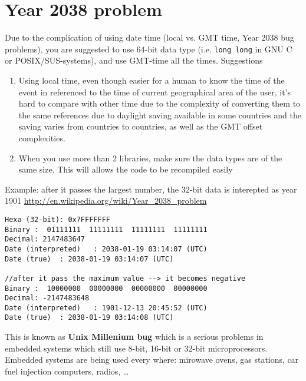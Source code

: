 % 



\section{Year 2038 problem}

Due to the complication of using date time (local vs. GMT time, Year 2038 bug
problems), you are suggested to use 64-bit data type (i.e. \verb!long long! in
GNU C or POSIX/SUS-systems), and use GMT-time all the times. Suggestions
\begin{enumerate}
  \item  Using local time,
even though easier for a human to know the time of the event in referenced to
the time of current geographical area of the user, it's hard to compare with
other time due to the complexity of converting them to the same
references due to daylight saving available in some countries and the saving
varies from countries to countries, as well as the GMT offset complexities.

  \item When you use more than 2 libraries, make sure the data types are of the
same size. This will allows the code to be recompiled easily
  
\end{enumerate}

Example: after it passes the largest number, the 32-bit data
is interepted as year 1901 \url{http://en.wikipedia.org/wiki/Year_2038_problem}
\begin{verbatim}
Hexa (32-bit): 0x7FFFFFFF
Binary :  01111111  11111111  11111111  11111111  
Decimal: 2147483647
Date (interpreted)   : 2038-01-19 03:14:07 (UTC)
Date (true)  : 2038-01-19 03:14:07 (UTC)

//after it pass the maximum value --> it becomes negative
Binary :  10000000  00000000  00000000  00000000
Decimal: -2147483648
Date (interpreted)   : 1901-12-13 20:45:52 (UTC)
Date (true)  : 2038-01-19 03:14:08 (UTC)
\end{verbatim}

This is known as {\bf Unix Millenium bug} which is a serious problems in
embedded systems which still use 8-bit, 16-bit or 32-bit microprocessors.
Embedded systems are being used every where: mirowave ovens, gas stations, car
fuel injection computers, radios, \ldots


